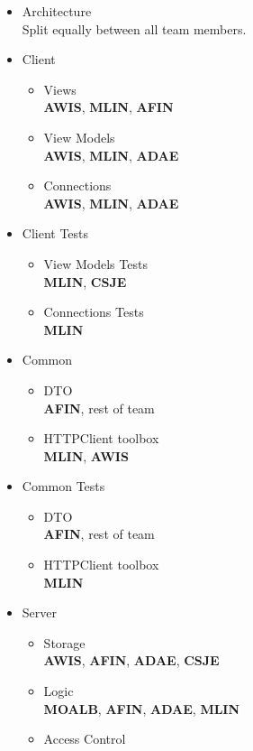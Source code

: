 \begin{itemize}
	\item Architecture\\
	Split equally between all team members.
	\item Client
	\begin{itemize}
		\item Views\\
		\textbf{AWIS}, \textbf{MLIN}, \textbf{AFIN}
		\item View Models\\
		\textbf{AWIS}, \textbf{MLIN}, \textbf{ADAE}
		\item Connections\\
		\textbf{AWIS}, \textbf{MLIN}, \textbf{ADAE}
	\end{itemize}
	\item Client Tests
	\begin{itemize}
		\item View Models Tests\\
		\textbf{MLIN}, \textbf{CSJE}
		\item Connections Tests\\
		\textbf{MLIN}
	\end{itemize}
	\item Common
	\begin{itemize}
		\item DTO\\
		\textbf{AFIN}, rest of team
		\item HTTPClient toolbox\\
		\textbf{MLIN}, \textbf{AWIS}
	\end{itemize}
	\item Common Tests
	\begin{itemize}
		\item DTO\\
		\textbf{AFIN}, rest of team
		\item HTTPClient toolbox\\
		\textbf{MLIN}
	\end{itemize}
	\item Server
	\begin{itemize}
		\item Storage\\
		\textbf{AWIS}, \textbf{AFIN}, \textbf{ADAE}, \textbf{CSJE}
		\item Logic\\
		\textbf{MOALB}, \textbf{AFIN}, \textbf{ADAE}, \textbf{MLIN} 
		\item Access Control\\

\end{itemize}
\end{itemize}
